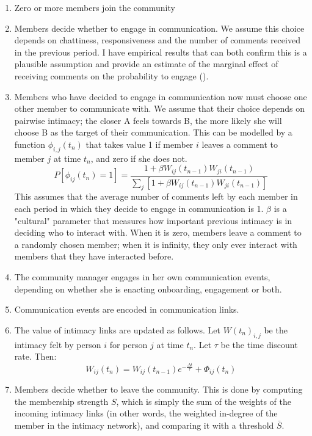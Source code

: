 \documentclass{article}
\begin{document}
\begin{enumerate}
\item Zero or more members join the community
\item Members decide whether to engage in communication. We assume this choice depends on chattiness, responsiveness and the number of comments received in the previous period. I have empirical results that can both confirm this is a plausible assumption and provide an estimate of the marginal effect of receiving comments on the probability to engage (\cite{cottica2016microfoundations}).
\item Members who have decided to engage in communication now must choose one other member to communicate with. We assume that their choice depends on pairwise intimacy; the closer A feels towards B, the more likely she will choose B as the target of their communication. This can be modelled by a function $\phi_{i,j} (t_n)$ that takes value 1 if member $i$ leaves a comment to member $j$ at time $t_n$, and zero if she does not. 
\begin{equation}
	P [\phi_{ij}(t_n) = 1] = \frac{1 + \beta W_{ij}(t_{n-1}) W_{ji}(t_{n-1})}{\sum_j [1 + \beta W_{ij}(t_{n-1}) W_{ji}(t_{n-1})]}
	\label{eq:mainEngine}
 \end {equation}
 This assumes that the average number of comments left by each member in each period in which they decide to engage in communication is 1. $\beta$ is a "cultural" parameter that measures how important previous intimacy is in deciding who to interact with. When it is zero, members leave a comment to a randomly chosen member; when it is infinity, they only ever interact with members that they have interacted before. 
\item The community manager engages in her own communication events, depending on whether she is enacting onboarding, engagement or both.
\item Communication events are encoded in communication links.
\item The value of intimacy links are updated as follows. Let $W(t_n)_{i,j}$ be the intimacy felt by person $i$ for person $j$ at time $t_n$. Let $\tau$ be the time discount rate. Then: 
\begin{equation}
	W_{ij}(t_n) = W_{ij}(t_{n-1})e^{-\frac{\Delta t}{\tau}} + \Phi_{ij}(t_n)
	\label{eq:updating}
\end{equation}
\item Members decide whether to leave the community. This is done by computing the membership strength $S$, which is simply the sum of the weights of the incoming intimacy links (in other words, the weighted in-degree of the member in the intimacy network), and comparing it with a threshold $\bar{S}$.
\end{enumerate}
\end{document}
